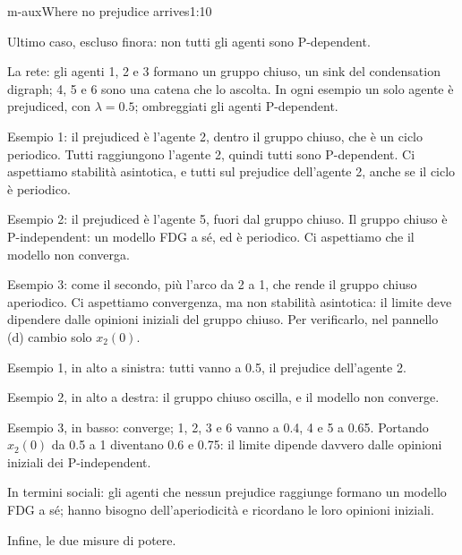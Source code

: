 \begin{slidedue}{m-aux}{Where no prejudice arrives}{1:10}
  \begin{discorso}
    \item Ultimo caso, escluso finora: non tutti gli agenti sono P-dependent.
    \item La rete: gli agenti 1, 2 e 3 formano un gruppo chiuso, un sink del condensation digraph; 4, 5 e 6 sono una catena che lo ascolta. In ogni esempio un solo agente è prejudiced, con $\lambda=0.5$; ombreggiati gli agenti P-dependent.
    \item Esempio 1: il prejudiced è l'agente 2, dentro il gruppo chiuso, che è un ciclo periodico. Tutti raggiungono l'agente 2, quindi tutti sono P-dependent. Ci aspettiamo stabilità asintotica, e tutti sul prejudice dell'agente 2, anche se il ciclo è periodico.
    \item Esempio 2: il prejudiced è l'agente 5, fuori dal gruppo chiuso. Il gruppo chiuso è P-independent: un modello FDG a sé, ed è periodico. Ci aspettiamo che il modello non converga.
    \item Esempio 3: come il secondo, più l'arco da 2 a 1, che rende il gruppo chiuso aperiodico. Ci aspettiamo convergenza, ma non stabilità asintotica: il limite deve dipendere dalle opinioni iniziali del gruppo chiuso. Per verificarlo, nel pannello (d) cambio solo $x_2(0)$.
    \item \clic Esempio 1, in alto a sinistra: tutti vanno a 0.5, il prejudice dell'agente 2.
    \item Esempio 2, in alto a destra: il gruppo chiuso oscilla, e il modello non converge.
    \item Esempio 3, in basso: converge; 1, 2, 3 e 6 vanno a 0.4, 4 e 5 a 0.65. Portando $x_2(0)$ da 0.5 a 1 diventano 0.6 e 0.75: il limite dipende davvero dalle opinioni iniziali dei P-independent.
    \item In termini sociali: gli agenti che nessun prejudice raggiunge formano un modello FDG a sé; hanno bisogno dell'aperiodicità e ricordano le loro opinioni iniziali.
    \item Infine, le due misure di potere.
  \end{discorso}
\end{slidedue}


